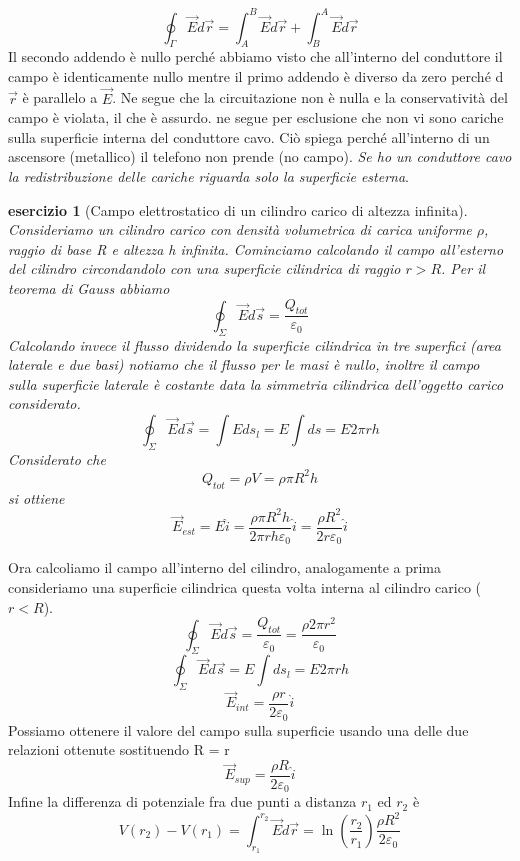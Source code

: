 \documentclass[10pt,a4paper]{article}
\newtheorem{esercizio}{esercizio}
\begin{document}
\begin{enumerate}
\[\oint_{\Gamma}\vec{E}d\vec{r}= \int_{A}^{B}\vec{E}d\vec{r}+\int_{B}^{A}\vec{E}d\vec{r}\]
Il secondo addendo è nullo perché abbiamo visto che all'interno del conduttore il campo è identicamente nullo mentre il primo addendo è diverso da zero perché d$\vec{r}$ è parallelo a $\vec{E}$. Ne segue che la circuitazione non è nulla e la conservatività del campo è violata, il che è assurdo. ne segue per esclusione che non vi sono cariche sulla superficie interna del conduttore cavo. Ciò spiega perché all'interno di un ascensore (metallico) il telefono non prende (no campo). 
\textit{Se ho un conduttore cavo la redistribuzione delle cariche riguarda solo la superficie esterna}. 
\end{enumerate}
\begin{esercizio}[Campo elettrostatico di un cilindro carico di altezza infinita]
Consideriamo un cilindro carico con densità volumetrica di carica uniforme $\rho$, raggio di base R e altezza h infinita. Cominciamo calcolando il campo all'esterno del cilindro circondandolo con una superficie cilindrica di raggio \(r>R\). Per il teorema di Gauss abbiamo
\[\oint_{\Sigma}\vec{E}d\vec{s}=\frac{Q_{tot}}{\varepsilon_0}\]
Calcolando invece il flusso dividendo la superficie cilindrica in tre superfici (area laterale e due basi) notiamo che il flusso per le masi è nullo, inoltre il campo sulla superficie laterale è costante data la simmetria cilindrica dell'oggetto carico considerato.
\[\oint_{\Sigma}\vec{E}d\vec{s}=\int E ds_l = E\int ds = E2\pi r h\]
Considerato che
\[Q_{tot} = \rho V = \rho \pi R^2 h\]
si ottiene
\[\vec{E}_{est} = E \hat{i} = \frac{\rho \pi R^2 h }{2\pi r h \varepsilon_0} \hat{i}= \frac{\rho R^2 }{2 r \varepsilon_0}\hat{i}\]
\end{esercizio}
Ora calcoliamo il campo all'interno del cilindro, analogamente a prima consideriamo una superficie cilindrica questa volta interna al cilindro carico (\(r<R\)). 
\[\oint_{\Sigma}\vec{E}d\vec{s}=\frac{Q_{tot}}{\varepsilon_0} = \frac{\rho 2 \pi r^2}{\varepsilon_0}\]
\[\oint_{\Sigma}\vec{E}d\vec{s}=E\int ds_l = E2\pi rh\]
\[\vec{E}_{int} = \frac{\rho r}{2\varepsilon_0}\hat{i}\]
Possiamo ottenere il valore del campo sulla superficie usando una delle due relazioni ottenute sostituendo R = r
\[\vec{E}_{sup} = \frac{\rho R}{2\varepsilon_0}\hat{i}\]
Infine la differenza di potenziale fra due punti a distanza \(r_1\) ed \(r_2\) è
\[V(r_2)-V(r_1) = \int_{r_1}^{r_2}\vec{E}d\vec{r}=\ln\left(\frac{r_2}{r_1}\right)\frac{\rho R^2}{2\varepsilon_0}\]
\end{document}
